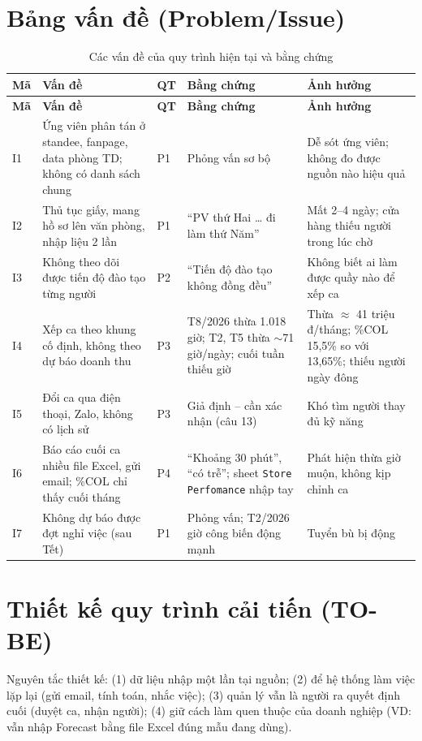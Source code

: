 \documentclass[12pt,a4paper,oneside]{report}
\begin{document}
\section{Bảng vấn đề (Problem/Issue)}
\begin{longtable}{C{0.7cm}L{3.8cm}C{0.8cm}L{4.0cm}L{4.1cm}}
\caption{Các vấn đề của quy trình hiện tại và bằng chứng}\label{tab:problem}\\
\toprule \textbf{Mã} & \textbf{Vấn đề} & \textbf{QT} & \textbf{Bằng chứng} & \textbf{Ảnh hưởng} \\\midrule\endfirsthead
\toprule \textbf{Mã} & \textbf{Vấn đề} & \textbf{QT} & \textbf{Bằng chứng} & \textbf{Ảnh hưởng} \\\midrule\endhead
I1 & Ứng viên phân tán ở standee, fanpage, data phòng TD; không có danh sách chung & P1 & Phỏng vấn sơ bộ & Dễ sót ứng viên; không đo được nguồn nào hiệu quả \\
I2 & Thủ tục giấy, mang hồ sơ lên văn phòng, nhập liệu 2 lần & P1 & ``PV thứ Hai … đi làm thứ Năm'' & Mất 2–4 ngày; cửa hàng thiếu người trong lúc chờ \\
I3 & Không theo dõi được tiến độ đào tạo từng người & P2 & ``Tiến độ đào tạo không đồng đều'' & Không biết ai làm được quầy nào để xếp ca \\
I4 & Xếp ca theo khung cố định, không theo dự báo doanh thu & P3 & T8/2026 thừa 1.018 giờ; T2, T5 thừa $\sim$71 giờ/ngày; cuối tuần thiếu giờ & Thừa $\approx$ 41 triệu đ/tháng; \%COL 15,5\% so với 13,65\%; thiếu người ngày đông \\
I5 & Đổi ca qua điện thoại, Zalo, không có lịch sử & P3 & Giả định – cần xác nhận (câu 13) & Khó tìm người thay đủ kỹ năng \\
I6 & Báo cáo cuối ca nhiều file Excel, gửi email; \%COL chỉ thấy cuối tháng & P4 & ``Khoảng 30 phút'', ``có trễ''; sheet \texttt{Store Perfomance} nhập tay & Phát hiện thừa giờ muộn, không kịp chỉnh ca \\
I7 & Không dự báo được đợt nghỉ việc (sau Tết) & P1 & Phỏng vấn; T2/2026 giờ công biến động mạnh & Tuyển bù bị động \\
\bottomrule
\end{longtable}

\section{Thiết kế quy trình cải tiến (TO-BE)}
Nguyên tắc thiết kế: (1) dữ liệu nhập một lần tại nguồn; (2) để hệ thống làm việc lặp lại (gửi email, tính toán, nhắc việc); (3) quản lý vẫn là người ra quyết định cuối (duyệt ca, nhận người); (4) giữ cách làm quen thuộc của doanh nghiệp (VD: vẫn nhập Forecast bằng file Excel đúng mẫu đang dùng).
\end{document}
